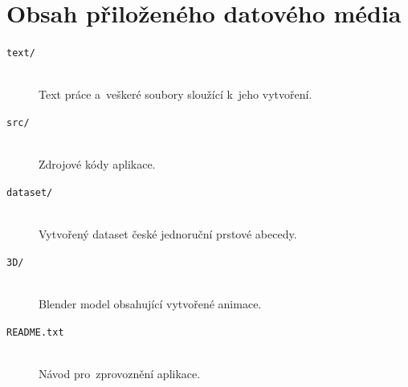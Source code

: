 \documentclass[
  master,
  program=ainfvs,
  biblatex,
  figures=true,
  tables=false,
  sourcecodes=true,
  glossaries,
  index
]{kidiplom}
\begin{document}
\appendix


\section{Obsah přiloženého datového média} \label{sec:ObsahData}

\begin{description}

    \item[\texttt{text/}] \hfill \\
        Text práce a~veškeré soubory sloužící k~jeho vytvoření.
    
    \item[\texttt{src/}] \hfill \\
        Zdrojové kódy aplikace.
    
    \item[\texttt{dataset/}] \hfill \\
        Vytvořený dataset české jednoruční prstové abecedy.
    
    \item[\texttt{3D/}] \hfill \\
        Blender model obsahující vytvořené animace.
    
    \item[\texttt{README.txt}] \hfill \\ 
        Návod pro~zprovoznění aplikace.
   

\end{description}


\nocite{*}
\printbibliography
\end{document}
